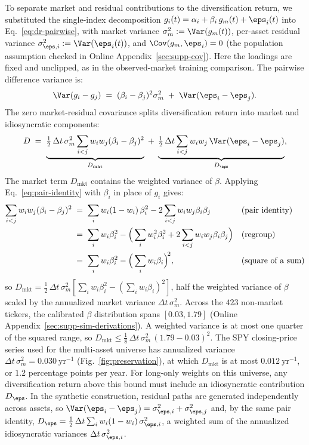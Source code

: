 To separate market and residual contributions to the diversification
return, we substituted the single-index decomposition
$g_i(t) = \alpha_i + \beta_i\, g_m(t) + \eps_i(t)$ into
Eq.~\eqref{eq:dr-pairwise}, with market variance
$\sigma_m^2 := \Var(g_m(t))$, per-asset residual variance
$\sigma_{\eps,i}^2 := \Var(\eps_i(t))$, and $\Cov(g_m, \eps_i) = 0$
(the population assumption checked in Online
Appendix~\ref{sec:supp-cov}). Here the loadings are fixed and
unclipped, as in the observed-market training comparison. The
pairwise difference variance is:
\begin{equation}
  \Var(g_i - g_j) \;=\; (\beta_i - \beta_j)^2 \sigma_m^2
  \;+\; \Var(\eps_i - \eps_j).
\end{equation}
The zero market-residual covariance splits diversification return into market and idiosyncratic components:
\begin{equation}
  D \;=\;
  \underbrace{\tfrac{1}{2}\,\Delta t\,\sigma_m^2 \sum_{i<j} w_i w_j (\beta_i - \beta_j)^2}_{D_{\mathrm{mkt}}}
  \;+\;
  \underbrace{\tfrac{1}{2}\,\Delta t \sum_{i<j} w_i w_j \,\Var(\eps_i - \eps_j)}_{D_\eps},
  \label{eq:dr-sim}
\end{equation}
The market term $D_\mathrm{mkt}$ contains the weighted variance of $\beta$. Applying Eq.~\eqref{eq:pair-identity} with $\beta_i$ in place of $g_i$ gives:
\begin{align}
  \sum_{i<j} w_i w_j (\beta_i - \beta_j)^2
   &\;=\; \sum_i w_i (1 - w_i)\, \beta_i^2
     - 2 \sum_{i<j} w_i w_j \beta_i \beta_j
     && \text{(pair identity)} \notag \\
   &\;=\; \sum_i w_i \beta_i^2
     - \Big(\sum_i w_i^2 \beta_i^2
     + 2 \sum_{i<j} w_i w_j \beta_i \beta_j\Big)
     && \text{(regroup)} \notag \\
   &\;=\; \sum_i w_i \beta_i^2 - \Big(\sum_i w_i \beta_i\Big)^{\!2},
     && \text{(square of a sum)}
\end{align}
so $D_\mathrm{mkt} = \tfrac{1}{2}\,\Delta t\,\sigma_m^2 [\sum_i w_i
\beta_i^2 - (\sum_i w_i \beta_i)^2]$, half the weighted variance of $\beta$
scaled by the annualized market variance $\Delta t\,\sigma_m^2$.
Across the $423$ non-market tickers, the calibrated $\beta$
distribution spans $[0.03, 1.79]$ (Online Appendix~\ref{sec:supp-sim-derivations}). A
weighted variance is at most one quarter of the squared range, so
$D_{\mathrm{mkt}} \le \tfrac{1}{8}\,\Delta t\,\sigma_m^2\,(1.79 -
0.03)^2$. The SPY closing-price series used for the multi-asset
universe has annualized variance $\Delta t\,\sigma_m^2 =
0.030~\mathrm{yr}^{-1}$ (Fig.~\ref{fig:preservation}), at which
$D_{\mathrm{mkt}}$ is at most $0.012~\mathrm{yr}^{-1}$, or $1.2$
percentage points per year. For long-only weights on this universe, any diversification return
above this bound must include an idiosyncratic contribution $D_\eps$. In the synthetic construction, residual paths are
generated independently across assets, so
$\Var(\eps_i - \eps_j) = \sigma_{\eps,i}^2 + \sigma_{\eps,j}^2$ and,
by the same pair identity,
$D_\eps = \tfrac{1}{2}\,\Delta t \sum_i w_i (1 - w_i)\,
\sigma_{\eps,i}^2$, a weighted sum of the annualized idiosyncratic
variances $\Delta t\,\sigma_{\eps,i}^2$.

